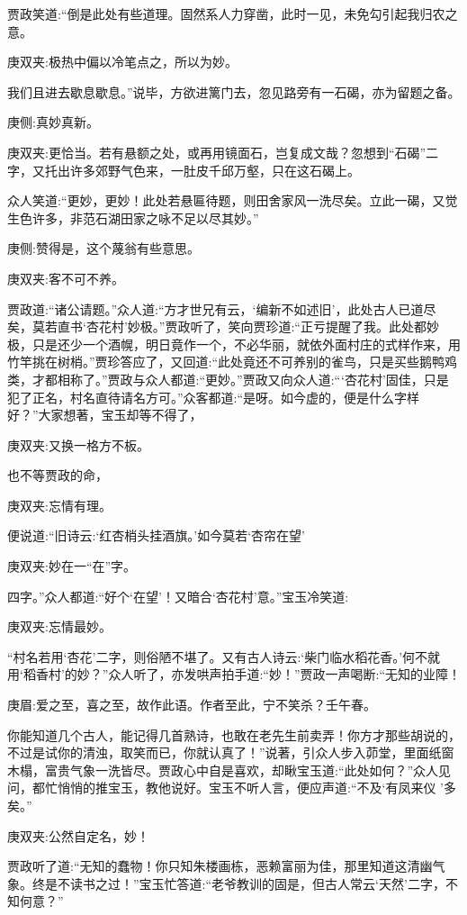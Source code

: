 \begin{parag}
    贾政笑道:“倒是此处有些道理。固然系人力穿凿，此时一见，未免勾引起我归农之意。\begin{note}庚双夹:极热中偏以冷笔点之，所以为妙。\end{note}我们且进去歇息歇息。”说毕，方欲进篱门去，忽见路旁有一石碣，亦为留题之备。\begin{note}庚侧:真妙真新。\end{note}\begin{note}庚双夹:更恰当。若有悬额之处，或再用镜面石，岂复成文哉？忽想到“石碣”二字，又托出许多郊野气色来，一肚皮千邱万壑，只在这石碣上。\end{note}众人笑道:“更妙，更妙！此处若悬匾待题，则田舍家风一洗尽矣。立此一碣，又觉生色许多，非范石湖田家之咏不足以尽其妙。”\begin{note}庚侧:赞得是，这个蔑翁有些意思。\end{note}\begin{note}庚双夹:客不可不养。\end{note}贾政道:“诸公请题。”众人道:“方才世兄有云，‘编新不如述旧’，此处古人已道尽矣，莫若直书‘杏花村’妙极。”贾政听了，笑向贾珍道:“正亏提醒了我。此处都妙极，只是还少一个酒幌，明日竟作一个，不必华丽，就依外面村庄的式样作来，用竹竿挑在树梢。”贾珍答应了，又回道:“此处竟还不可养别的雀鸟，只是买些鹅鸭鸡类，才都相称了。”贾政与众人都道:“更妙。”贾政又向众人道:“‘杏花村’固佳，只是犯了正名，村名直待请名方可。”众客都道:“是呀。如今虚的，便是什么字样好？”大家想著，宝玉却等不得了，\begin{note}庚双夹:又换一格方不板。\end{note}也不等贾政的命，\begin{note}庚双夹:忘情有理。\end{note}便说道:“旧诗云:‘红杏梢头挂酒旗。’如今莫若‘杏帘在望’\begin{note}庚双夹:妙在一“在”字。\end{note}四字。”众人都道:“好个‘在望’！又暗合‘杏花村’意。”宝玉冷笑道:\begin{note}庚双夹:忘情最妙。\end{note}“村名若用‘杏花’二字，则俗陋不堪了。又有古人诗云:‘柴门临水稻花香。’何不就用‘稻香村’的妙？”众人听了，亦发哄声拍手道:“妙！”贾政一声喝断:“无知的业障！\begin{note}庚眉:爱之至，喜之至，故作此语。作者至此，宁不笑杀？壬午春。\end{note}你能知道几个古人，能记得几首熟诗，也敢在老先生前卖弄！你方才那些胡说的，不过是试你的清浊，取笑而已，你就认真了！”说著，引众人步入茆堂，里面纸窗木榻，富贵气象一洗皆尽。贾政心中自是喜欢，却瞅宝玉道:“此处如何？”众人见问，都忙悄悄的推宝玉，教他说好。宝玉不听人言，便应声道:“不及‘有凤来仪 ’多矣。”\begin{note}庚双夹:公然自定名，妙！\end{note}贾政听了道:“无知的蠢物！你只知朱楼画栋，恶赖富丽为佳，那里知道这清幽气象。终是不读书之过！”宝玉忙答道:“老爷教训的固是，但古人常云‘天然’二字，不知何意？”
\end{parag}


